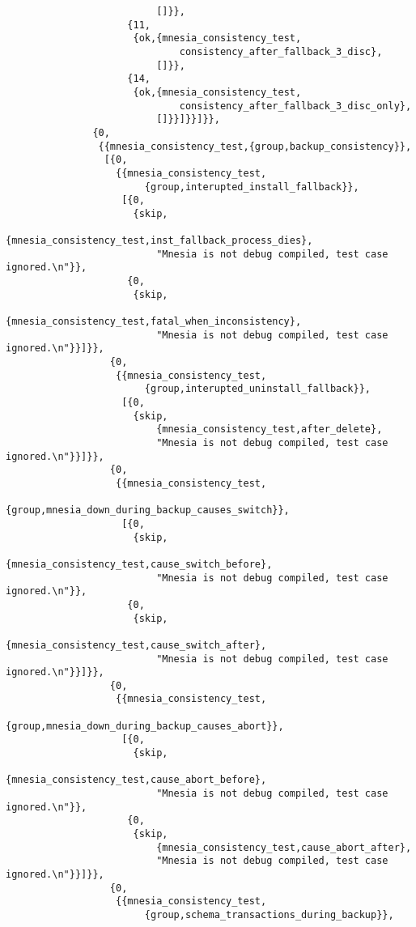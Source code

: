 \begin{verbatim}
                          []}},
                     {11,
                      {ok,{mnesia_consistency_test,
                              consistency_after_fallback_3_disc},
                          []}},
                     {14,
                      {ok,{mnesia_consistency_test,
                              consistency_after_fallback_3_disc_only},
                          []}}]}}]}},
               {0,
                {{mnesia_consistency_test,{group,backup_consistency}},
                 [{0,
                   {{mnesia_consistency_test,
                        {group,interupted_install_fallback}},
                    [{0,
                      {skip,
                          {mnesia_consistency_test,inst_fallback_process_dies},
                          "Mnesia is not debug compiled, test case ignored.\n"}},
                     {0,
                      {skip,
                          {mnesia_consistency_test,fatal_when_inconsistency},
                          "Mnesia is not debug compiled, test case ignored.\n"}}]}},
                  {0,
                   {{mnesia_consistency_test,
                        {group,interupted_uninstall_fallback}},
                    [{0,
                      {skip,
                          {mnesia_consistency_test,after_delete},
                          "Mnesia is not debug compiled, test case ignored.\n"}}]}},
                  {0,
                   {{mnesia_consistency_test,
                        {group,mnesia_down_during_backup_causes_switch}},
                    [{0,
                      {skip,
                          {mnesia_consistency_test,cause_switch_before},
                          "Mnesia is not debug compiled, test case ignored.\n"}},
                     {0,
                      {skip,
                          {mnesia_consistency_test,cause_switch_after},
                          "Mnesia is not debug compiled, test case ignored.\n"}}]}},
                  {0,
                   {{mnesia_consistency_test,
                        {group,mnesia_down_during_backup_causes_abort}},
                    [{0,
                      {skip,
                          {mnesia_consistency_test,cause_abort_before},
                          "Mnesia is not debug compiled, test case ignored.\n"}},
                     {0,
                      {skip,
                          {mnesia_consistency_test,cause_abort_after},
                          "Mnesia is not debug compiled, test case ignored.\n"}}]}},
                  {0,
                   {{mnesia_consistency_test,
                        {group,schema_transactions_during_backup}},

\end{verbatim}
